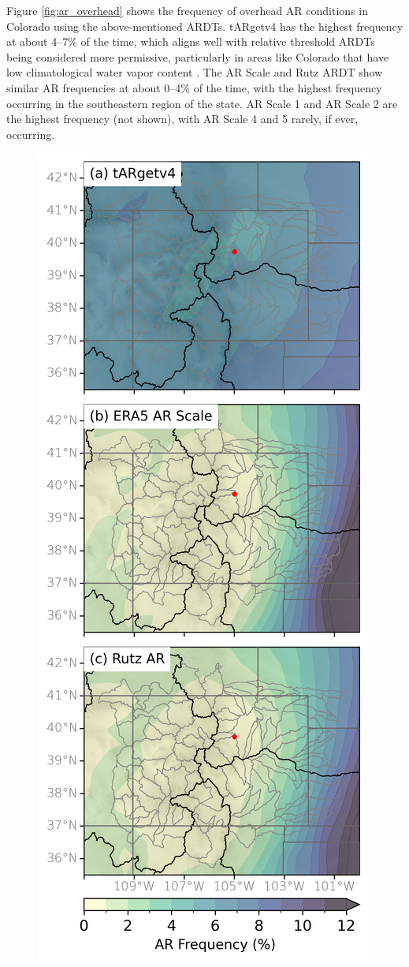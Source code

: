 \documentclass[draft]{agujournal2019}
\begin{document}
Figure \ref{fig:ar_overhead} shows the frequency of overhead AR conditions in Colorado using the above-mentioned ARDTs.  tARgetv4 has the highest frequency at about 4--7\% of the time, which aligns well with relative threshold ARDTs being considered more permissive, particularly in areas like Colorado that have low climatological water vapor content \cite{Rutz2019ARTMIP}. The AR Scale and Rutz ARDT show similar AR frequencies at about 0--4\% of the time, with the highest frequency occurring in the southeastern region of the state. AR Scale 1 and AR Scale 2 are the highest frequency (not shown), with AR Scale 4 and 5 rarely, if ever, occurring. 

\begin{figure}
\includegraphics{fig1.png}

\end{figure}
\end{document}
